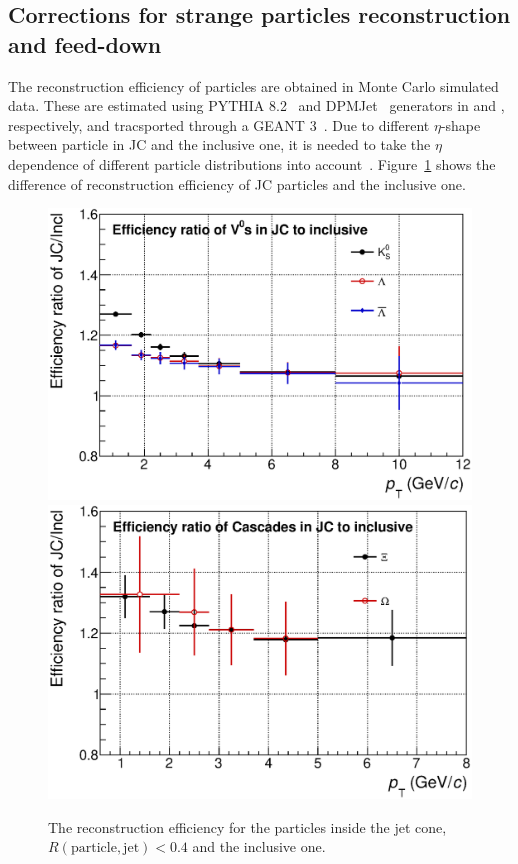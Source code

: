 \subsection{Corrections for strange particles reconstruction and feed-down}
\label{SubSec:Correction}
The reconstruction efficiency of particles are obtained in Monte Carlo simulated data. These are estimated using PYTHIA 8.2~\cite{Sjostrand:2014zea} and DPMJet~\cite{Roesler:2000he} generators in \pp and \pPb, respectively, and tracsported through a GEANT 3~\cite{Brun:1994aa}. Due to different $\eta$-shape between particle in JC and the inclusive one, it is needed to take the $\eta$ dependence of different particle distributions into account~\cite{V0injet}. Figure~\ref{Fig:EffiJCIncl} shows the difference of reconstruction efficiency of JC particles and the inclusive one. 
\begin{figure}[!ht]
	\begin{center}
		\includegraphics[width=.4\textwidth]{figures/JCtoIncl_EffiRatio_V0}
		\includegraphics[width=.4\textwidth]{figures/JCtoIncl_EffiRatio_Cascade}
	\end{center}
	\caption{The reconstruction efficiency for the particles inside the jet cone, $R(\mathrm{particle, jet}) < 0.4$ and the inclusive one. }
	\label{Fig:EffiJCIncl}
\end{figure}


